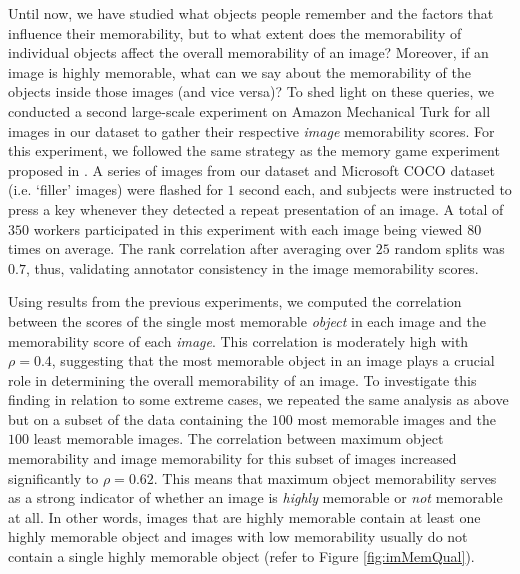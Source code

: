 \begin{figure*}[!thb]
\centering
{}
\vspace{-16pt}\caption{\footnotesize\textbf{Max object memorability predicts image memorability.} Top row: most memorable images taken from our dataset along with their highest memorable object and their respective memorability scores. Bottom row: least memorable images in the dataset along with their most memorable object and their respective memorability scores. We notice that the maximum object memorability correlates strongly with image memorability in both the cases. }\label{fig:imMemQual}%
\end{figure*}

Until now, we have studied what objects people remember and the factors that influence their memorability, but to what extent does the memorability of individual objects affect the overall memorability of an image? Moreover, if an image is highly memorable, what can we say about the memorability of the objects inside those images (and vice versa)? To shed light on these queries, we conducted a second large-scale experiment on Amazon Mechanical Turk for all images in our dataset to gather their respective \emph{image} memorability scores. For this experiment, we followed the same strategy as the memory game experiment proposed in \cite{isola11}. A series of images from our dataset and Microsoft COCO dataset \cite{coco14} (i.e. `filler' images) were flashed for $1$ second each, and subjects were instructed to press a key whenever they detected a repeat presentation of an image. A total of $350$ workers participated in this experiment with each image being viewed $80$ times on average. The rank correlation after averaging over $25$ random splits was $0.7$, thus, validating annotator consistency in  the image memorability scores.






Using results from the previous experiments, we computed the correlation between the scores of the single most memorable \emph{object} in each image and the memorability score of each \emph{image}. This correlation is moderately high with $\rho=0.4$, suggesting that the most memorable object in an  image plays a crucial role in determining the overall memorability of an image. To investigate this finding in relation to some extreme cases, we repeated the same analysis as above but on a subset of the data containing the $100$ most memorable images and the $100$ least memorable images. The correlation between maximum object memorability and image memorability for this subset of images increased significantly to $\rho=0.62$. This means that maximum object memorability serves as a strong indicator of whether an image is \textit{highly} memorable or \emph{not} memorable at all. In other words, images that are highly memorable contain at least one highly memorable object and images with low memorability usually do not contain a single highly memorable object (refer to Figure \ref{fig:imMemQual}).

